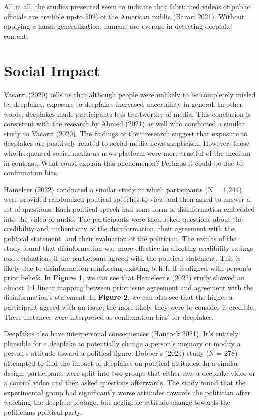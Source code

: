 \documentclass[
  journal=small,
  manuscript=article-type,  %
  year=2020,
  volume=37,
]{cup-journal}
\begin{document}
All in all, the studies presented seem to indicate that fabricated videos of public officials are credible up-to 50\% of the American public (Barari 2021). Without applying a harsh generalization, humans are average in detecting deepfake content.  

\section{Social Impact}
Vacarri (2020) tells us that although people were unlikely to be completely misled by deepfakes, exposure to deepfakes increased uncertainty in general. In other words, deepfakes made participants less trustworthy of media. This conclusion is consistent with the research by Ahmed (2021) as well who conducted a similar study to Vacarri (2020). The findings of their research suggest that exposure to deepfakes are positively related to social media news skepticism. However, those who frequented social media as news platform were more trustful of the medium in contrast. What could explain this phenomenon? Perhaps it could be due to confirmation bias. 

Hameleer (2022) conducted a similar study in which participants (N = 1,244) were provided randomized political speeches to view and then asked to answer a set of questions. Each political speech had some form of disinformation embedded into the video or audio. The participants were then asked questions about the credibility and authenticity of the disinformation, their agreement with the political statement, and their evaluation of the politician. The results of the study found that disinformation was more effective in affecting credibility ratings and evaluations if the participant agreed with the political statement. This is likely due to disinformation reinforcing existing beliefs if it aligned with person's prior beliefs. In \textbf{Figure 1}, we can see that Hameleer's (2022) study showed an almost 1:1 linear mapping between prior issue agreement and agreement with the disinformation's statement. In \textbf{Figure 2}, we can also see that the higher a participant agreed with an issue, the more likely they were to consider it credible. These instances were interpreted as confirmation bias' for deepfakes. 

Deepfakes also have interpersonal consequences (Hancock 2021). It's entirely plausible for a deepfake to potentially change a person's memory or modify a person's attitude toward a political figure. Dobber's (2021) study (N = 278) attempted to find the impact of deepfakes on political attitudes. In a similar design, participants were split into two groups that either saw a deepfake video or a control video and then asked questions afterwards. The study found that the experimental group had significantly worse attitudes towards the politician after watching the deepfake footage, but negligible attitude change towards the politicians political party. 
\end{document}
